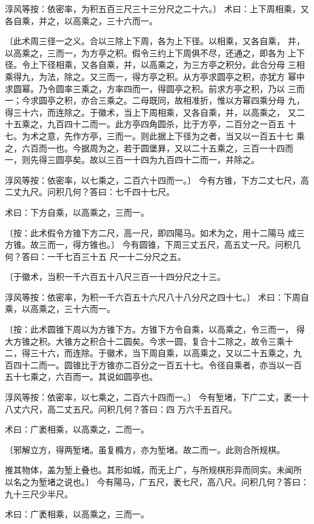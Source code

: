 \documentclass[a4paper,12pt,UTF8,twoside]{ctexbook}
\begin{document}
淳风等按：依密率，为积五百三尺三十三分尺之二十六。〕 术曰：上下周相乘，又各自乘，并之，以高乘之，三十六而一。

〔此术周三径一之义。合以三除上下周，各为上下径。以相乘，又各自乘， 并，以高乘之，三而一，为方亭之积。假令三约上下周俱不尽，还通之，即各为 上下径。令上下径相乘，又各自乘，并，以高乘之，为三方亭之积分。此合分母 三相乘得九，为法，除之。又三而一，得方亭之积。从方亭求圆亭之积，亦犹方 幂中求圆幂。乃令圆率三乘之，方率四而一，得圆亭之积。前求方亭之积，乃以 三而一；今求圆亭之积，亦合三乘之。二母既同，故相准折，惟以方幂四乘分母 九，得三十六，而连除之。于徽术，当上下周相乘，又各自乘，并，以高乘之， 又二十五乘之，九百四十二而一。此方亭四角圆杀，比于方亭，二百分之一百五 十七。为术之意，先作方亭，三而一。则此据上下径为之者，当又以一百五十七 乘之，六百而一也。今据周为之，若于圆堡昪，又以二十五乘之，三百一十四而 一，则先得三圆亭矣。故以三百一十四为九百四十二而一，并除之。

淳风等按：依密率，以七乘之，二百六十四而一。〕 今有方锥，下方二丈七尺，高二丈九尺。问积几何？答曰：七千四十七尺。

术曰：下方自乘，以高乘之，三而一。

〔按：此术假令方锥下方二尺，高一尺，即四陽马。如术为之，用十二陽马 成三方锥。故三而一，得方锥也。〕 今有圆锥，下周三丈五尺，高五丈一尺。问积几何？答曰：一千七百三十五 尺一十二分尺之五。

〔于徽术，当积一千六百五十八尺三百一十四分尺之十三。

淳风等按：依密率，为积一千六百五十六尺八十八分尺之四十七。〕 术曰：下周自乘，以高乘之，三十六而一。

〔按：此术圆锥下周以为方锥下方。方锥下方令自乘，以高乘之，令三而一， 得大方锥之积。大锥方之积合十二圆矣。今求一圆，复合十二除之，故令三乘十 二，得三十六，而连除。于徽术，当下周自乘，以高乘之，又以二十五乘之，九 百四十二而一。圆锥比于方锥亦二百分之一百五十七。令径自乘者，亦当以一百 五十七乘之，六百而一。其说如圆亭也。

淳风等按：依密率，以七乘之，二百六十四而一。〕 今有堑堵，下广二丈，袤一十八丈六尺，高二丈五尺。问积几何？答曰：四 万六千五百尺。

术曰：广袤相乘，以高乘之，二而一。

〔邪解立方，得两堑堵。虽复橢方，亦为堑堵。故二而一。此则合所规棋。

推其物体，盖为堑上叠也。其形如城，而无上广，与所规棋形异而同实。未闻所 以名之为堑堵之说也。〕 今有陽马，广五尺，袤七尺，高八尺。问积几何？答曰：九十三尺少半尺。

术曰：广袤相乘，以高乘之，三而一。
\end{document}
